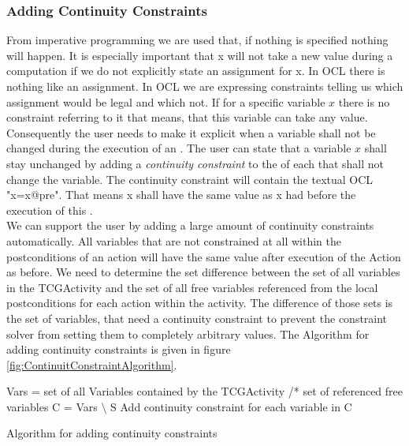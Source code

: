 \subsubsection{Adding Continuity Constraints}
\label{sec:addingContinuityConstraints}
From imperative programming we are used that, if nothing is specified nothing will happen. It is especially important that x will not take a new value during a computation if we do not explicitly state an assignment for x. In OCL there is nothing like an assignment. In OCL we are expressing constraints telling us which assignment would be legal and which not. If for a specific variable $x$ there is no constraint referring to it that means, that this variable can take any value. Consequently the user needs to make it explicit when a variable shall not be changed during the execution of an . The user can state that a variable $x$ shall stay unchanged by adding a \emph{continuity constraint} to the  of each  that shall not change the variable. The continuity constraint will contain the textual OCL "x=x@pre". That means x shall have the same value as x had before the execution of this .\\
We can support the user by adding a large amount of continuity constraints automatically. All variables that are not constrained at all within the postconditions of an action will have the same value after execution of the Action as before. We need to determine the set difference between the set of all variables in the TCGActivity and the set of all free variables referenced from the local postconditions for each action within the activity. The difference of those sets is the set of variables, that need a continuity constraint to prevent the constraint solver from setting them to completely arbitrary values. The Algorithm for adding continuity constraints is given in figure \ref{fig:ContinuitConstraintAlgorithm}.
\begin{algorithm}
\begin{algorithmic}
\State Vars = set of all Variables contained by the TCGActivity
 	    /* set of referenced free variables
	\EndFor
	\State C = Vars $\setminus$ S
	\State Add continuity constraint for each variable in C
\EndFor
\end{algorithmic}
\caption{Algorithm for adding continuity constraints}
\label{fig:ContinuitConstraintAlgorithm}
\end{algorithm}
